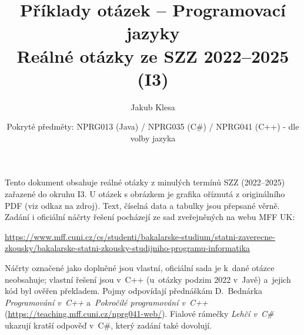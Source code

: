 \documentclass[11pt,a4paper]{article}
\title{Příklady otázek -- Programovací jazyky\\[0.3em]\large Reálné otázky ze SZZ 2022--2025 (I3)}
\author{Jakub Klesa}
\date{Pokryté předměty: NPRG013 (Java) / NPRG035 (C\#) / NPRG041 (C++) - dle volby jazyka}
\begin{document}
\maketitle
\tableofcontents
\bigskip

\begin{poznamka}
Tento dokument obsahuje reálné otázky z minulých termínů SZZ (2022--2025) zařazené do
okruhu I3. U otázek s obrázkem je grafika oříznutá z originálního PDF (viz odkaz na
zdroj). Text, číselná data a tabulky jsou přepsané věrně.
Zadání i oficiální náčrty řešení pocházejí ze sad zveřejněných na webu MFF UK:\par
{\raggedright\url{https://www.mff.cuni.cz/cs/studenti/bakalarske-studium/statni-zaverecne-zkousky/bakalarske-statni-zkousky-studijniho-programu-informatika}\par}
Náčrty označené jako doplněné jsou vlastní, oficiální sada je k~dané otázce neobsahuje;
vlastní řešení jsou v~C++ (u~otázky podzim 2022 v~Javě) a~jejich kód byl ověřen překladem.
Pojmy odpovídají přednáškám D.~Bednárka \emph{Programování v~C++} a~\emph{Pokročilé programování v~C++}
(\url{https://teaching.mff.cuni.cz/nprg041-web/}). Fialové rámečky \emph{Lehčí v~C\#} ukazují
kratší odpověď v~C\#, který zadání také dovolují.
\end{poznamka}
\bigskip







\end{document}

